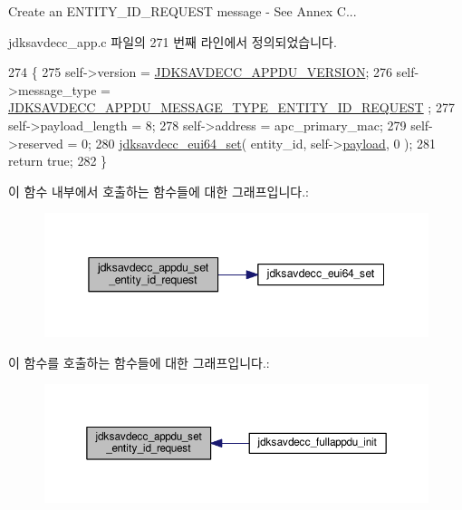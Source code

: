 Create an E\+N\+T\+I\+T\+Y\+\_\+\+I\+D\+\_\+\+R\+E\+Q\+U\+E\+ST message -\/ See Annex C... 

jdksavdecc\+\_\+app.\+c 파일의 271 번째 라인에서 정의되었습니다.


\begin{DoxyCode}
274 \{
275     \textcolor{keyword}{self}->version = \hyperlink{group__appdu__constants_ga56dc385655e74f514e98341140261880}{JDKSAVDECC\_APPDU\_VERSION};
276     \textcolor{keyword}{self}->message\_type = \hyperlink{group__appdu__constants_ga40c5d416d1df11d372c6695142d7c051}{JDKSAVDECC\_APPDU\_MESSAGE\_TYPE\_ENTITY\_ID\_REQUEST}
      ;
277     \textcolor{keyword}{self}->payload\_length = 8;
278     \textcolor{keyword}{self}->address = apc\_primary\_mac;
279     \textcolor{keyword}{self}->reserved = 0;
280     \hyperlink{group__eui64_ga1c5b342315464ff77cbc7d587765432d}{jdksavdecc\_eui64\_set}( entity\_id, self->\hyperlink{structjdksavdecc__appdu_aa5cbdad2c57e9b3f949e1a4d96382b66}{payload}, 0 );
281     \textcolor{keywordflow}{return} \textcolor{keyword}{true};
282 \}
\end{DoxyCode}


이 함수 내부에서 호출하는 함수들에 대한 그래프입니다.\+:
\nopagebreak
\begin{figure}[H]
\begin{center}
\leavevmode
\includegraphics[width=345pt]{group__app_ga4cb956f2bf8e2ba60fb699eaf87496b0_cgraph}
\end{center}
\end{figure}




이 함수를 호출하는 함수들에 대한 그래프입니다.\+:
\nopagebreak
\begin{figure}[H]
\begin{center}
\leavevmode
\includegraphics[width=350pt]{group__app_ga4cb956f2bf8e2ba60fb699eaf87496b0_icgraph}
\end{center}
\end{figure}


